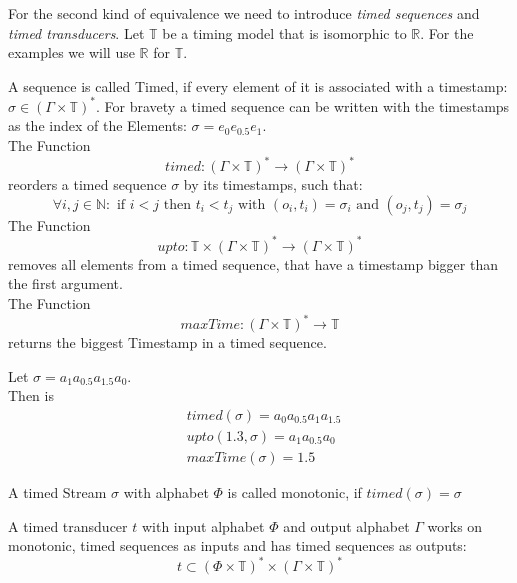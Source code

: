 For the second kind of equivalence we need to introduce \emph{timed sequences} and \emph{timed transducers}.
Let \(\mathbb{T}\) be a timing model that is isomorphic to \(\mathbb{R}\).
For the examples we will use \(\mathbb{R}\) for \(\mathbb{T}\).

\begin{definition}[name = Timed Sequence]\label{def:timed_sequence}
  A sequence is called Timed, if every element of it is associated with a timestamp: \(\sigma \in {(\Gamma\times\mathbb{T})}^*\).
  For bravety a timed sequence can be written with the timestamps as the index of the Elements: \(\sigma = e_0e_{0.5}e_1 \).\\
  The Function
  \[\mathit{timed: } {(\Gamma \times \mathbb{T})}^* \rightarrow {(\Gamma \times \mathbb{T})}^* \]
  reorders a timed sequence \(\sigma\) by its timestamps, such that:
  \[ \forall i,j \in \mathbb{N}:\text{ if } i < j \text{ then } t_i < t_j \text{ with } (o_i, t_i) = \sigma_i \text{ and } (o_j, t_j) = \sigma_j \]
  The Function
  \[\mathit{upto: } \mathbb{T} \times {(\Gamma\times\mathbb{T})}^* \rightarrow {(\Gamma\times\mathbb{T})}^*\]
  removes all elements from a timed sequence, that have a timestamp bigger than the first argument.\\
  The Function
  \[\mathit{maxTime: } {(\Gamma\times\mathbb{T})}^* \rightarrow \mathbb{T} \]
  returns the biggest Timestamp in a timed sequence.
\end{definition}

\begin{exmp}[name=Functions on timed Sequences]
Let \(\sigma = a_1a_{0.5}a_{1.5}a_0\).\\
  Then is
    \begin{align*}
      &\mathit{timed} (\sigma) = a_0a_{0.5}a_1a_{1.5}\ \\
      &\mathit{upto} (1.3,\sigma) = a_1a_{0.5}a_0 \\
      &\mathit{maxTime} (\sigma) = 1.5
    \end{align*}
\end{exmp}

\begin{definition}[name = Monotonicity of Timed Streams]\label{def:monotonicity_timed_streams}
  A timed Stream \(\sigma\) with alphabet \(\Phi\) is called monotonic,
  if \( \mathit{timed}(\sigma) = \sigma\)
\end{definition}

\begin{definition}[name = Timed Transducer]\label{def:timed_transducer}
  A timed transducer \(t\) with input alphabet \(\Phi\) and output alphabet \(\Gamma\) works on monotonic, timed sequences as inputs and has timed sequences as outputs:
  \[t \subset {\left(\Phi \times \mathbb{T}\right)}^* \times {\left(\Gamma \times \mathbb{T}\right)}^*\]
\end{definition}


